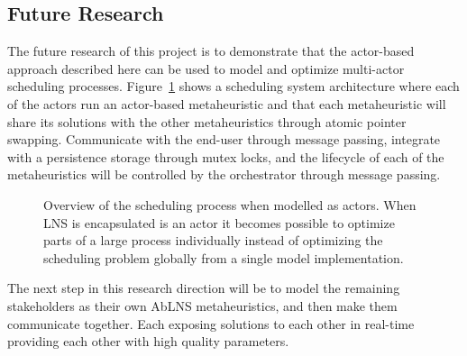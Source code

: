 \subsection{Future Research}
\label{sec:discussion:future_research}
The future research of this project is to demonstrate that
the actor-based approach described here can be used to model and optimize 
multi-actor scheduling processes. 
Figure~\ref{fig:ordinator-architecture}
shows a scheduling system architecture where each of the actors run an actor-based metaheuristic
and that each metaheuristic will share its solutions with the other
metaheuristics through atomic pointer swapping. Communicate with the end-user
through message passing, integrate with a persistence storage through mutex
locks, and the lifecycle of each of the metaheuristics will be controlled by
the orchestrator through message passing. 

\begin{figure}[H]
	\centering
	
	\caption{
		Overview of the scheduling process when modelled as actors. When LNS is encapsulated 
		is an actor it becomes possible to optimize parts of a large process individually instead of 
		optimizing the scheduling problem globally from a single model implementation.
	}
	\label{fig:ordinator-architecture}
\end{figure}

The next step in this research direction will be to model the remaining stakeholders as their own 
AbLNS metaheuristics, and then make them communicate together. Each exposing solutions to each 
other in real-time providing each other with high quality parameters.
